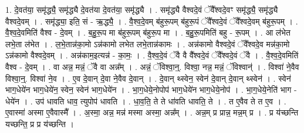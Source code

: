 \documentclass[17pt]{extarticle}
\begin{document}
1. दे॒वत॑या॒ समृ॑द्ध्यै॒ समृ॑द्ध्यै दे॒वत॑या दे॒वत॑या॒ समृ॑द्ध्यै । . समृ॑द्ध्यै वैश्वदे॒वं ॅवै᳚श्वदे॒वꣳ समृ॑द्ध्यै॒ समृ॑द्ध्यै वैश्वदे॒वम् । . समृ॑द्ध्या॒ इति॒ सं - ऋ॒द्ध्यै॒ । . वै॒श्व॒दे॒वम् ब॑हुरू॒पम् ब॑हुरू॒पं ॅवै᳚श्वदे॒वं ॅवै᳚श्वदे॒वम् ब॑हुरू॒पम् । . वै॒श्व॒दे॒वमिति॑ वैश्व - दे॒वम् । . ब॒हु॒रू॒प मा ब॑हुरू॒पम् ब॑हुरू॒प मा । . ब॒हु॒रू॒पमिति॑ बहु - रू॒पम् । . आ ल॑भेत लभे॒ता ल॑भेत । . ल॒भे॒तान्न॑का॒मो ऽन्न॑कामो लभेत लभे॒तान्न॑कामः । . अन्न॑कामो वैश्वदे॒वं ॅवै᳚श्वदे॒व मन्न॑का॒मो ऽन्न॑कामो वैश्वदे॒वम् । . अन्न॑काम॒इत्यन्न॑ - का॒मः॒ । . वै॒श्व॒दे॒वं ॅवै वै वै᳚श्वदे॒वं ॅवै᳚श्वदे॒वं ॅवै । . वै॒श्व॒दे॒वमिति॑ वैश्व - दे॒वम् । . वा अन्न॒ मन्नं॒ ॅवै वा अन्न᳚म् । . अन्नं॒ ॅविश्वा॒न्॒. विश्वा॒ नन्न॒ मन्नं॒ ॅविश्वान्॑ । . विश्वा॑ ने॒वैव विश्वा॒न्॒. विश्वा॑ ने॒व । . ए॒व दे॒वान् दे॒वा ने॒वैव दे॒वान् । . दे॒वान् थ्स्वेन॒ स्वेन॑ दे॒वान् दे॒वान् थ्स्वेन॑ । . स्वेन॑ भाग॒धेये॑न भाग॒धेये॑न॒ स्वेन॒ स्वेन॑ भाग॒धेये॑न । . भा॒ग॒धेये॒नोपोप॑ भाग॒धेये॑न भाग॒धेये॒नोप॑ । . भा॒ग॒धेये॒नेति॑ भाग - धेये॑न । . उप॑ धावति धाव॒ त्युपोप॑ धावति । . धा॒व॒ति॒ ते ते धा॑वति धावति॒ ते । . त ए॒वैव ते त ए॒व । . ए॒वास्मा॑ अस्मा ए॒वैवास्मै᳚ । . अ॒स्मा॒ अन्न॒ मन्न॑ मस्मा अस्मा॒ अन्न᳚म् । . अन्न॒म् प्र प्रान्न॒ मन्न॒म् प्र । . प्र य॑च्छन्ति यच्छन्ति॒ प्र प्र य॑च्छन्ति । \newline
\end{document}
